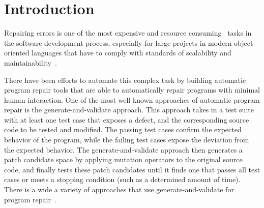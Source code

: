 \documentclass[conference]{IEEEtran}
\newcommand{\todo}[1]
  {{\scriptsize \textbf{\color{red} {#1}}}}
\begin{document}
\section{Introduction} \label{introduction}



Repairing errors is one of the most expensive\cite{Tassey02,Britton13} and 
resource consuming~\cite{Weiss07} tasks in 
the software development process, especially for large projects in modern 
object-oriented languages that have to comply with standards of scalability and 
maintainability~\cite{Liblit03,Anvik05}. 

There have been efforts to automate this complex task by 
building automatic program repair tools that are able to automatically repair 
programs with minimal human interaction. One of the most well known approaches of automatic program repair
is the generate-and-validate approach. This approach takes in a test suite with at least one test case that exposes 
a defect, and the corresponding source code to be 
tested and modified. The passing test cases confirm the
expected behavior of the program, while the failing test cases expose the
deviation from the expected behavior. 
The generate-and-validate approach then generates a patch candidate space by applying 
mutation operators to the original source code, and finally tests these patch 
candidates until it finds one that passes all test cases or meets a stopping 
condition (such as a determined amount of time). There is a wide a variety of approaches that use generate-and-validate for 
program 
repair~\cite{legoues12,kim2013,Weimer13,fan15,long15,debroy10,perkins09,wei10}. 
\end{document}
